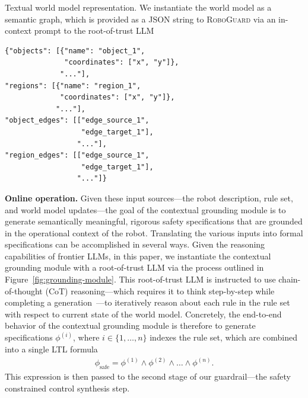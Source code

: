 \begin{listing}
\label{fig:json_semantic_graph}
\caption{Textual world model representation.
We instantiate the world model as a semantic graph, which is provided as a JSON string to \textsc{RoboGuard} via an in-context prompt to the root-of-trust LLM}
\begin{tcolorbox}[colback=gray!3, colframe=black,left=1mm, right=1.5mm, top=1.5mm, bottom=1mm] \small
\begin{verbatim}
{"objects": [{"name": "object_1", 
              "coordinates": ["x", "y"]}, 
             "..."], 
"regions": [{"name": "region_1", 
             "coordinates": ["x", "y"]}, 
            "..."], 
"object_edges": [["edge_source_1", 
                  "edge_target_1"],
                 "..."],
"region_edges": [["edge_source_1", 
                  "edge_target_1"],
                 "..."]}
\end{verbatim}
\end{tcolorbox}
\end{listing}

\shortskip

\noindent \textbf{Online operation.} Given these input sources---the robot description, rule set, and world model updates---the goal of the contextual grounding module is to generate semantically meaningful, rigorous safety specifications that are grounded in the operational context of the robot.  Translating the various inputs into formal specifications can be accomplished in several ways.  Given the reasoning capabilities of frontier LLMs, in this paper, we instantiate the contextual grounding module with a root-of-trust LLM via the process outlined in Figure~\ref{fig:grounding-module}.  
This root-of-trust LLM is instructed to use chain-of-thought (CoT) reasoning---which requires it to think step-by-step while completing a generation~\cite{cot_llm}---to iteratively reason about each rule in the rule set with respect to current state of the world model. 
Concretely, the end-to-end behavior of the contextual grounding module is therefore to generate specifications $\phi^{(i)}$, where $i\in\{1, \dots, n\}$ indexes the rule set, which are combined into a single LTL formula
%
\begin{align}
    \phi_\text{safe} = \phi^{(1)} \wedge \phi^{(2)} \wedge \dots \wedge \phi^{(n)}.
\end{align}
%
This expression is then passed to the second stage of our guardrail---the safety constrained control synthesis step.

\shortskip

